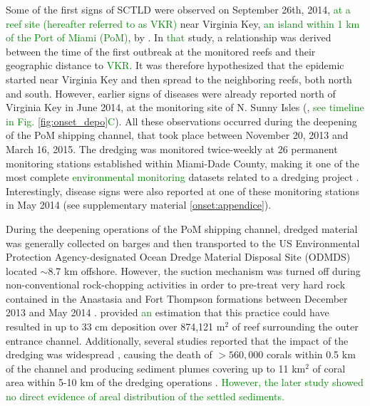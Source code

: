 \documentclass[preprint,12pt,authoryear]{elsarticle}
\newcommand{\modif}[1]{\textcolor{green}{#1}}
\begin{document}
Some of the first signs of SCTLD were observed on September 26th, 2014, \modif{at a reef site (hereafter referred to as VKR)} near Virginia Key, \modif{an island within 1 km of the Port of Miami (PoM)}, by \cite{precht2016unprecedented}. In \modif{that} study, a relationship was derived between the time of the first outbreak at the monitored reefs and their geographic distance to \modif{VKR}. It was therefore hypothesized that the epidemic started near Virginia Key and then spread to the neighboring reefs, both north and south. However, earlier signs of diseases were already reported north of Virginia Key in June 2014, at the monitoring site of N. Sunny Isles (\citealp{precht2016unprecedented}, \modif{see timeline in Fig. \ref{fig:onset_depo}C}). All these observations occurred during the deepening of the PoM shipping channel, that took place between November 20, 2013 and March 16, 2015. The dredging was monitored twice-weekly at 26 permanent monitoring stations established within Miami-Dade County, making it one of the most complete \modif{environmental monitoring} datasets related to a dredging project \citep{gintert2019regional}. Interestingly, disease signs were also reported at one of these monitoring stations in May 2014 (see supplementary material \ref{onset:appendice}).

During the deepening operations of the PoM shipping channel, dredged material was generally collected on barges and then transported to the US Environmental Protection Agency\modif{-}designated Ocean Dredge Material Disposal Site (ODMDS) located $\sim$8.7 km offshore. However, the suction mechanism was turned off during non-conventional rock-chopping activities in order to pre-treat very hard rock contained in the Anastasia and Fort Thompson formations between December 2013 and May 2014 \citep{miller2016detecting}. \cite{usace2017} provided \modif{an} estimation that this practice could have resulted in up to 33 cm deposition over 874,121 m$^2$ of reef surrounding the outer entrance channel. Additionally, several studies reported that the impact of the dredging was widespread \citep{miller2016detecting}, causing the death of  $> 560,000$ corals within 0.5 km of the channel \citep{cunning2019extensive} and producing sediment plumes covering up to 11 km$^2$ of coral area within 5-10 km of the dredging operations \citep{barnes2015sediment}. \modif{However, the later study showed no direct evidence of areal distribution of the settled sediments.} 
\end{document}
